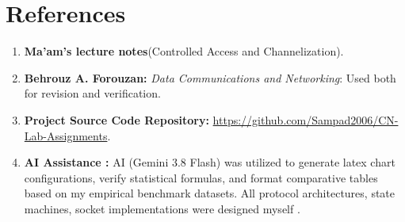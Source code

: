 \documentclass[11pt,a4paper]{article}
\begin{document}
\section{References}
\begin{enumerate}
    \item \textbf{Ma'am's lecture notes}(Controlled Access and Channelization).
    \item \textbf{Behrouz A. Forouzan:} \textit{Data Communications and Networking}: Used both for revision and verification.
    \item \textbf{Project Source Code Repository:} \url{https://github.com/Sampad2006/CN-Lab-Assignments}.
    \item \textbf{AI Assistance :} AI (Gemini 3.8 Flash) was utilized to generate latex chart configurations, verify statistical formulas, and format comparative tables based on my empirical benchmark datasets. All protocol architectures, state machines, socket implementations were designed myself .
\end{enumerate}
\end{document}
